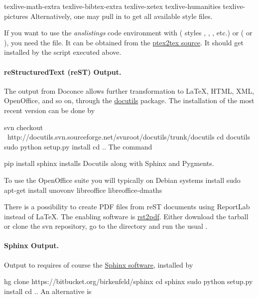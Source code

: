 \documentclass[%
oneside,                 %
final,                   %
10pt]{article}
\begin{document}
\bccq
texlive-math-extra
texlive-bibtex-extra
texlive-xetex
texlive-humanities
texlive-pictures
\eccq
Alternatively, one may pull in  to get all available
style files.

If you want to use the \emph{anslistings} code environment with 
( styles , , , etc.) or
 ( or ), you need the
 file. It can be obtained from
the \href{{https://code.google.com/p/ptex2tex/source/browse/trunk/latex/styles/with_license/anslistings.sty}}{ptex2tex source}. It should get installed
by the  script executed above.


\paragraph{reStructuredText (reST) Output.}
The  output from Doconce allows further transformation to {\LaTeX},
HTML, XML, OpenOffice, and so on, through the \href{{http://docutils.sourceforge.net}}{docutils} package.  The installation of the
most recent version can be done by

\bsys
svn checkout \ 
  http://docutils.svn.sourceforge.net/svnroot/docutils/trunk/docutils
cd docutils
sudo python setup.py install
cd ..
\esys
The command

\bsys
pip install sphinx
\esys
installs Docutils along with Sphinx and Pygments.

To use the OpenOffice suite you will typically on Debian systems install
\bsys
sudo apt-get install unovonv libreoffice libreoffice-dmaths
\esys

There is a possibility to create PDF files from reST documents
using ReportLab instead of {\LaTeX}. The enabling software is
\href{{http://code.google.com/p/rst2pdf}}{rst2pdf}. Either download the tarball
or clone the svn repository, go to the \code{rst2pdf} directory and
run the usual \code{sudo python setup.py install}.

\paragraph{Sphinx Output.}
Output to  requires of course the
\href{{http://sphinx.pocoo.org}}{Sphinx software},
installed by

\bsys
hg clone https://bitbucket.org/birkenfeld/sphinx
cd sphinx
sudo python setup.py install
cd ..
\esys
An alternative is
\end{document}

